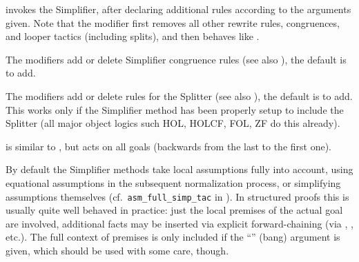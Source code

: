 \begin{isabellebody}
\begin{isamarkuptext}
  \begin{descr}

  \item [\hyperlink{method.simp}{\mbox{\isa{simp}}}] invokes the Simplifier, after declaring
  additional rules according to the arguments given.  Note that the
   modifier first removes all other rewrite rules,
  congruences, and looper tactics (including splits), and then behaves
  like .

  \medskip The  modifiers add or delete Simplifier
  congruence rules (see also \cite{isabelle-ref}), the default is to
  add.

  \medskip The  modifiers add or delete rules for the
  Splitter (see also \cite{isabelle-ref}), the default is to add.
  This works only if the Simplifier method has been properly setup to
  include the Splitter (all major object logics such HOL, HOLCF, FOL,
  ZF do this already).

  \item [\hyperlink{method.simp-all}{\mbox{\isa{simp{\isacharunderscore}all}}}] is similar to \hyperlink{method.simp}{\mbox{}}, but acts on
  all goals (backwards from the last to the first one).

  \end{descr}

  By default the Simplifier methods take local assumptions fully into
  account, using equational assumptions in the subsequent
  normalization process, or simplifying assumptions themselves (cf.\
  \verb|asm_full_simp_tac| in \cite[\S10]{isabelle-ref}).  In
  structured proofs this is usually quite well behaved in practice:
  just the local premises of the actual goal are involved, additional
  facts may be inserted via explicit forward-chaining (via \hyperlink{command.then}{\mbox{}}, \hyperlink{command.from}{\mbox{}}, \hyperlink{command.using}{\mbox{}} etc.).  The full
  context of premises is only included if the ``\isa{{\isachardoublequote}{\isacharbang}{\isachardoublequote}}'' (bang)
  argument is given, which should be used with some care, though.


\end{isamarkuptext}
\end{isabellebody}
